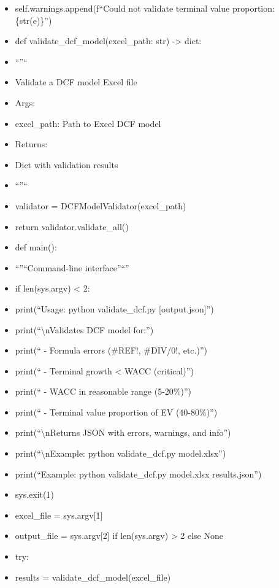 \documentclass[11pt]{article}
\begin{document}
\begin{itemize}[leftmargin=*,itemsep=2pt,topsep=2pt]
\item {} self.warnings.append(f``Could not validate terminal value proportion: \{str(e)\}'')
\item {} def validate\_\allowbreak{}dcf\_\allowbreak{}model(excel\_\allowbreak{}path: str) -> dict:
\item {} ``''``
\item {} Validate a DCF model Excel file
\item {} Args:
\item {} excel\_\allowbreak{}path: Path to Excel DCF model
\item {} Returns:
\item {} Dict with validation results
\item {} ``''``
\item {} validator = DCFModelValidator(excel\_\allowbreak{}path)
\item {} return validator.validate\_\allowbreak{}all()
\item {} def main():
\item {} ``''``Command-line interface''``''
\item {} if len(sys.argv) < 2:
\item {} print(``Usage: python validate\_\allowbreak{}dcf.py [output.json]'')
\item {} print(``\textbackslash{}nValidates DCF model for:'')
\item {} print(`` - Formula errors (\#REF!, \#DIV/0!, etc.)'')
\item {} print(`` - Terminal growth < WACC (critical)'')
\item {} print(`` - WACC in reasonable range (5-20\%)'')
\item {} print(`` - Terminal value proportion of EV (40-80\%)'')
\item {} print(``\textbackslash{}nReturns JSON with errors, warnings, and info'')
\item {} print(``\textbackslash{}nExample: python validate\_\allowbreak{}dcf.py model.xlsx'')
\item {} print(``Example: python validate\_\allowbreak{}dcf.py model.xlsx results.json'')
\item {} sys.exit(1)
\item {} excel\_\allowbreak{}file = sys.argv[1]
\item {} output\_\allowbreak{}file = sys.argv[2] if len(sys.argv) > 2 else None
\item {} try:
\item {} results = validate\_\allowbreak{}dcf\_\allowbreak{}model(excel\_\allowbreak{}file)

\end{itemize}
\end{document}

